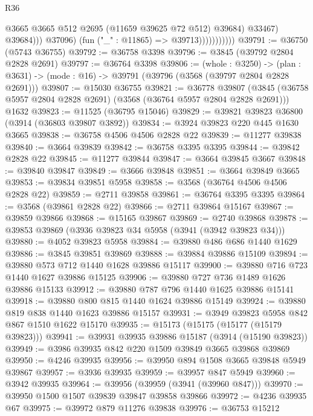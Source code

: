 \begin{lexlean}{R36}
\begin{coremodule}
                                    @3665
                                    @3665
                                    @512
                                    @2695
                                    (@11659 @39625 @72 @512)
                                    @39684)
                                  @33467)
                                @39684)))
                          @37096)
                        (fun ("_" : @11865) => @39713)))))))))))
@39791 := @36750 (@5743 @36755)
@39792 := @36758 @3398
@39796 := @3845 (@39792 @2804 @2828 @2691)
@39797 := @36764 @3398
@39806 := (whole : @3250) ->
  (plan : @3631) -> (mode : @16) -> @39791 (@39796 (@3568 (@39797 @2804 @2828 @2691)))
@39807 := @15030 @36755
@39821 := @36778
    @39807
    (@3845 (@36758 @5957 @2804 @2828 @2691) (@3568 (@36764 @5957 @2804 @2828 @2691)))
    @1632
@39823 := @11525 (@36795 @15046)
@39829 := @39821 @39823 @36800 (@3914 (@36803 @39807 @3892))
@39834 := @3924 @39823 @220 @445 @1630 @3665
@39838 := @36758 @4506 @4506 @2828 @22
@39839 := @11277 @39838
@39840 := @3664 @39839
@39842 := @36758 @3395 @3395
@39844 := @39842 @2828 @22
@39845 := @11277 @39844
@39847 := @3664 @39845 @3667
@39848 := @39840 @39847
@39849 := @3666 @39848
@39851 := @3664 @39849 @3665
@39853 := @39834 @39851 @5958
@39858 := @3568 (@36764 @4506 @4506 @2828 @22)
@39859 := @2711 @39858
@39861 := @36764 @3395 @3395
@39864 := @3568 (@39861 @2828 @22)
@39866 := @2711 @39864 @15167
@39867 := @39859 @39866
@39868 := @15165 @39867
@39869 := @2740 @39868
@39878 := @39853 @39869 (@3936 @39823 @34 @5958 (@3941 (@3942 @39823 @34)))
@39880 := @4052 @39823 @5958
@39884 := @39880 @486 @686 @1440 @1629
@39886 := @3845 @39851 @39869
@39888 := @39884 @39886 @15109
@39894 := @39880 @573 @712 @1440 @1628 @39886 @15117
@39900 := @39880 @716 @723 @1440 @1627 @39886 @15125
@39906 := @39880 @727 @736 @1489 @1626 @39886 @15133
@39912 := @39880 @787 @796 @1440 @1625 @39886 @15141
@39918 := @39880 @800 @815 @1440 @1624 @39886 @15149
@39924 := @39880 @819 @838 @1440 @1623 @39886 @15157
@39931 := @3949 @39823 @5958 @842 @867 @1510 @1622 @15170
@39935 := @15173 (@15175 (@15177 (@15179 @39823)))
@39941 := @39931 @39935 @39886 @15187 (@3914 (@15190 @39823))
@39949 := @3986 @39935 @842 @220 @1509 @39849 @3665 @39868 @39869
@39950 := @4246 @39935
@39956 := @39950 @894 @1508 @3665 @39848 @5949 @39867
@39957 := @3936 @39935
@39959 := @39957 @847 @5949
@39960 := @3942 @39935
@39964 := @39956 (@39959 (@3941 (@39960 @847)))
@39970 := @39950 @1500 @1507 @39839 @39847 @39858 @39866
@39972 := @4236 @39935 @67
@39975 := @39972 @879 @11276 @39838
@39976 := @36753 @15212

\end{coremodule}
\end{lexlean}
